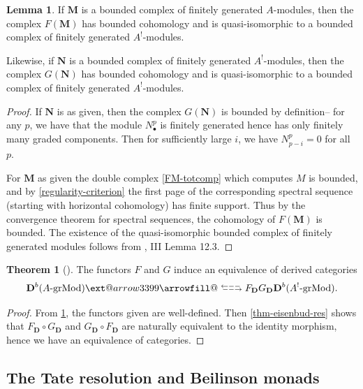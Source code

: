 \documentclass[a4paper]{article}
\makeatletter
\theoremstyle{definition}
\newtheorem{theorem}[defn]{Theorem}
\newtheorem{lemma}[defn]{Lemma}
\theoremstyle{remark}
\newcommand{\leftrarrows}{\mathrel{\raise.75ex\hbox{\oalign{%
  $\scriptstyle\leftarrow$\cr
  \vrule width0pt height.5ex$\hfil\scriptstyle\relbar$\cr}}}}
\newcommand{\lrightarrows}{\mathrel{\raise.75ex\hbox{\oalign{%
  $\scriptstyle\relbar$\hfil\cr
  $\scriptstyle\vrule width0pt height.5ex\smash\rightarrow$\cr}}}}
\newcommand{\Rrelbar}{\mathrel{\raise.75ex\hbox{\oalign{%
  $\scriptstyle\relbar$\cr
  \vrule width0pt height.5ex$\scriptstyle\relbar$}}}}
\def\leftrightarrowsfill@{\arrowfill@\leftrarrows\Rrelbar\lrightarrows}
\newcommand{\xleftrightarrows}[2][]{\ext@arrow 3399\leftrightarrowsfill@{#1}{#2}}
\newcommand{\grMod}{\ensuremath{\text{-grMod}}}
\newcommand{\deri}{\mathbf{D}}
\makeatother
\begin{document}
\begin{lemma}\label{derived-image-bounded}
    If \(\mathbf{M}\) is a bounded complex of finitely
    generated \(A\)-modules, then the complex \(F(\mathbf{M})\) has bounded
    cohomology and is quasi-isomorphic to a bounded complex of finitely
    generated \(A^!\)-modules. 

    Likewise, if \(\mathbf{N}\) is a bounded complex of finitely
    generated \(A^!\)-modules, then the complex \(G(\mathbf{N})\) has bounded
    cohomology and is quasi-isomorphic to a bounded complex of finitely
    generated \(A^!\)-modules.
    \begin{proof}
        If \(\mathbf{N}\) is as given, then the complex \(G(\mathbf{N})\) is
        bounded by definition-- for any \(p\), we have that the module
        \(N^p_\bullet\) is finitely generated hence has only finitely many
        graded components. Then for sufficiently large \(i\), we have
        \(N^p_{p-i}=0\) for all \(p\). 

        For \(\mathbf{M}\) as given the double complex \eqref{FM-totcomp} which
        computes \(M\) is bounded, and by \cref{regularity-criterion} the first
        page of the corresponding spectral sequence (starting with horizontal
        cohomology) has finite support. Thus by the convergence theorem for
        spectral sequences, the cohomology of \(F(\mathbf{M})\) is bounded. The
        existence of the quasi-isomorphic bounded complex of finitely generated
        modules follows from , III
        Lemma 12.3.
    \end{proof}
\end{lemma}

\begin{theorem}[]
    The functors \(F\) and \(G\) induce an equivalence of derived categories 
    \[ \deri^b(A\grMod) \xleftrightarrows[F_\deri]{G_\deri} \deri^b(A^!\grMod).\]
    \begin{proof}
        From \cref{derived-image-bounded}, the functors given are well-defined.
        Then \cref{thm-eisenbud-res} shows that \({F_\deri \circ G_\deri}\) and
        \(G_\deri \circ F_\deri\) are naturally equivalent to the identity
        morphism, hence we have an equivalence of categories.
    \end{proof}
\end{theorem}

\subsection{The Tate resolution and Beilinson monads}
\label{tateres}
\end{document}
